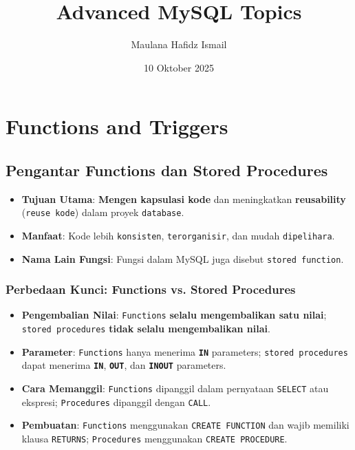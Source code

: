 \documentclass{article}
\title{Advanced MySQL Topics}
\date{10 Oktober 2025}
\author{Maulana Hafidz Ismail}
\begin{document}
\maketitle
\newpage

\tableofcontents
\newpage
{}

\section{Functions and Triggers}
\subsection{Pengantar Functions dan Stored Procedures}
\begin{itemize}
    \item \textbf{Tujuan Utama}: \textbf{Mengen kapsulasi kode} dan meningkatkan \textbf{reusability} (\texttt{reuse kode}) dalam proyek \texttt{database}.
    \item \textbf{Manfaat}: Kode lebih \texttt{konsisten}, \texttt{terorganisir}, dan mudah \texttt{dipelihara}.
    \item \textbf{Nama Lain Fungsi}: Fungsi dalam MySQL juga disebut \texttt{stored function}.
\end{itemize}

\subsubsection{Perbedaan Kunci: Functions vs. Stored Procedures}
\begin{itemize}
    \item \textbf{Pengembalian Nilai}: \texttt{Functions} \textbf{selalu mengembalikan satu nilai}; \texttt{stored procedures} \textbf{tidak selalu mengembalikan nilai}.
    \item \textbf{Parameter}: \texttt{Functions} hanya menerima \textbf{\texttt{IN}} parameters; \texttt{stored procedures} dapat menerima \textbf{\texttt{IN}}, \textbf{\texttt{OUT}}, dan \textbf{\texttt{INOUT}} parameters.
    \item \textbf{Cara Memanggil}: \texttt{Functions} dipanggil dalam pernyataan \texttt{SELECT} atau ekspresi; \texttt{Procedures} dipanggil dengan \texttt{CALL}.
    \item \textbf{Pembuatan}: \texttt{Functions} menggunakan \texttt{CREATE FUNCTION} dan wajib memiliki klausa \texttt{RETURNS}; \texttt{Procedures} menggunakan \texttt{CREATE PROCEDURE}.
\end{itemize}
\end{document}
